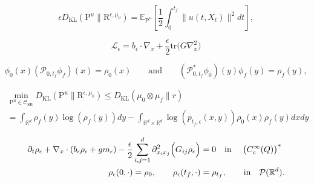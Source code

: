 \documentclass[10pt,a4paper]{amsart}
\newcommand{\KL}{D_{\mathrm{KL}}}
\newcommand{\R}{\mathbb{R}}
\begin{document}
\begin{equation}\label{kl_control_cost}
\epsilon\KL(\mathrm{P}^u \| \mathrm{R}^{\epsilon,\mu_0}) = \mathbb{E}_{\mathrm{P}^u} \left[ \frac12 \int_0^{t_f} \|u(t,  X_t)\|^2 dt \right],
\end{equation}

\begin{equation}\label{eq:Ito-generator}
\mathcal L_\epsilon 
= b_\epsilon\cdot\nabla_x +\frac{\epsilon}{2}\mathrm{tr}\!\big(G\nabla_x^2\big)
\end{equation}

\begin{equation}\label{eq:Sch-multplication_system}
\phi_0(x)(\mathscr P_{0,t_f} \phi_f)(x)=\rho_0(x)\qquad\text{and}\qquad (\mathscr P_{0,t_f}^* \phi_0)(y)\phi_f(y)=\rho_f(y),
\end{equation}

\begin{multline}\label{eq: finite_energy_bound}
\min_{\mathrm{P}^u \in \mathcal C_{\mathrm{SB}}} \KL(\mathrm{P}^u \| \mathrm{R}^{\epsilon,\mu_0})\leq \KL(\mu_0\otimes\mu_f \| r)\\=\int_{\R^d}\rho_f(y)\log(\rho_f(y))dy-\int_{\R^d\times\R^d}\log(p_{t_f,\epsilon}(x,y))\rho_0(x)\rho_f(y)dxdy
\end{multline}

\begin{align}
   \partial_t \rho_{\epsilon}
+ \nabla_x \cdot \left(b_{\epsilon}\rho_{\epsilon}+gm_{\epsilon}\right)
- \frac{\epsilon}{2} \sum_{i,j=1}^d 
\partial_{x_i x_j}^2 \Big(G_{ij} \rho_{\epsilon} \Big)
&= 0\quad\text{in }\quad \bigl(C_c^\infty(Q)\bigr)^{*}\label{eq: fb_constraint}\\
    \rho_{\epsilon}(0, \cdot) = \rho_0, 
    \qquad 
    \rho_{\epsilon}(t_f, \cdot) &= \rho_{t_f},\quad\quad\text{in\quad $\mathcal P(\R^d)$.} 
    \label{eq:endpoint_constraints}
\end{align}
\end{document}
